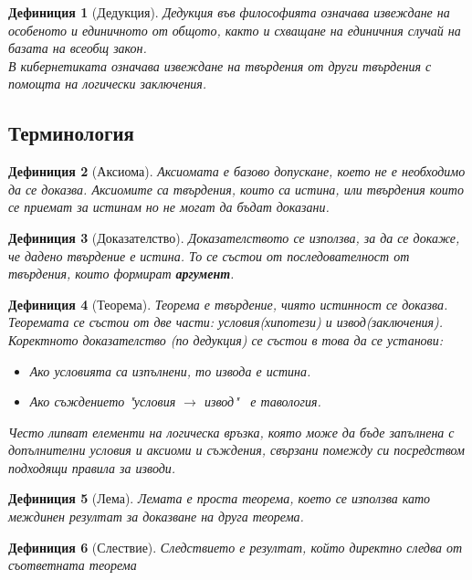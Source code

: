 \documentclass[fleqn, 12pt]{article}
\newtheorem{definition}{Дефиниция}[subsection]
\theoremstyle{definition}
\begin{document}
\begin{definition}[Дедукция]
Дедукция във философията означава извеждане на особеното и единичното от общото, както и схващане на единичния случай на базата на всеобщ закон. \\
В кибернетиката означава извеждане на твърдения от други твърдения с помощта на логически заключения.
\end{definition}

\subsection{Терминология}

\begin{definition}[Аксиома]
Аксиомата е базово допускане, което не е необходимо да се доказва. 
Аксиомите са твърдения, които са истина, или твърдения които се приемат за истинам но не могат да бъдат доказани. 
\end{definition}

\begin{definition}[Доказателство]
Доказателството се използва, за да се докаже, че дадено твърдение е истина. То се състои от последователност от твърдения, които формират \textbf{аргумент}.
\end{definition}

\begin{definition}[Теорема]
Теорема е твърдение, чиято истинност се доказва. \\
Теоремата се състои от две части: условия(хипотези) и  извод(заключения). \\
Коректното доказателство (по дедукция) се състои в това да се установи: 
\begin{itemize}
	\item Ако условията са изпълнени, то извода е истина.
	\item Ако съждението "условия $\to$ извод" \, е тавология.
\end{itemize}
Често липват елементи на логическа връзка, която може да бъде запълнена с допълнителни условия и аксиоми и съждения, свързани помежду си посредством подходящи правила за изводи. 
\end{definition}

\begin{definition}[Лема]
Лемата е проста теорема, което се използва като междинен резултат за доказване на друга теорема. 
\end{definition}

\begin{definition}[Слествие]
Следствието е резултат, който директно следва от съответната теорема
\end{definition}
\end{document}
